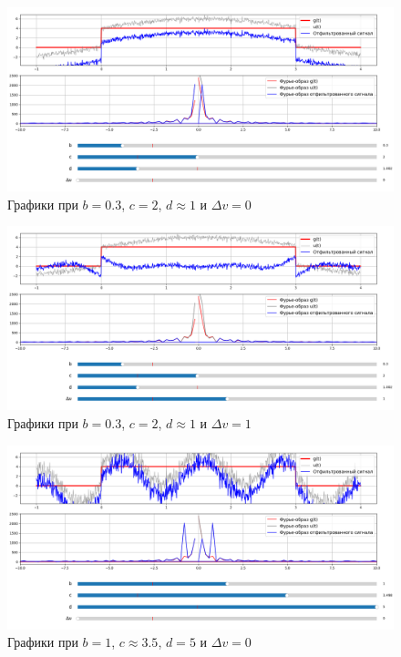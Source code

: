 \documentclass[a4paper,12pt]{article}
\begin{document}
\begin{figure}[H]  
    \centering
    \includegraphics[width=1\textwidth]{../images/1.4.4.png}
    \caption{Графики при \(b = 0.3\), \(c =  2\), \(d \approx 1\) и \(\varDelta  v = 0\)}  
    \label{fig:my_image}  
\end{figure}

\begin{figure}[H]  
    \centering
    \includegraphics[width=1\textwidth]{../images/1.4.5.png}
    \caption{Графики при \(b = 0.3\), \(c =  2\), \(d \approx 1\) и \(\varDelta  v = 1\)}  
    \label{fig:my_image}  
\end{figure}


\begin{figure}[H]  
    \centering
    \includegraphics[width=1\textwidth]{../images/1.4.6.png}
    \caption{Графики при \(b = 1\), \(c \approx 3.5\), \(d = 5\) и \(\varDelta  v = 0\)}  
    \label{fig:my_image}  
\end{figure}
\end{document}
